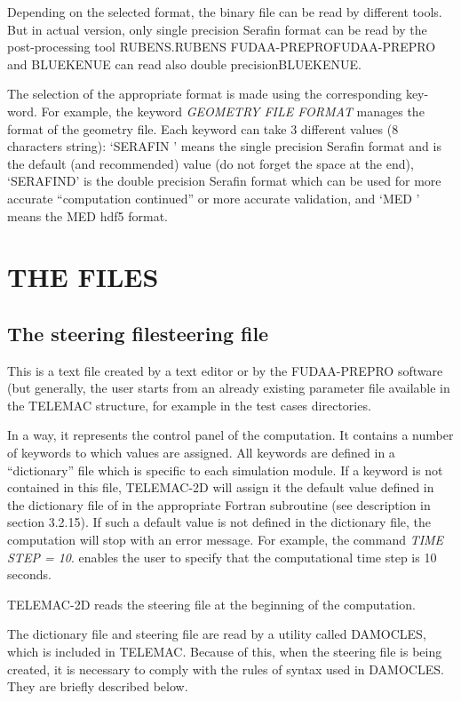  Depending on the selected format, the binary file can be read by different tools. But in actual version, only single precision Serafin format can be read by the post-processing tool RUBENS.RUBENS FUDAA-PREPROFUDAA-PREPRO and BLUEKENUE can read also double precisionBLUEKENUE.

 The selection of the appropriate format is made using the corresponding key-word. For example, the keyword \textit{GEOMETRY FILE FORMAT }manages the format of the geometry file. Each keyword can take 3 different values (8 characters string): `SERAFIN ' means the single precision Serafin format and is the default (and recommended) value (do not forget the space at the end), `SERAFIND' is the double precision Serafin format which can be used for more accurate ``computation continued'' or more accurate validation, and `MED     ' means the MED hdf5 format.


\section{ THE FILES}


\subsection{ The steering filesteering file}

 This is a text file created by a text editor or by the FUDAA-PREPRO software (but generally, the user starts from an already existing parameter file available in the TELEMAC structure, for example in the test cases directories.

 In a way, it represents the control panel of the computation. It contains a number of keywords to which values are assigned. All keywords are defined in a ``dictionary'' file which is specific to each simulation module. If a keyword is not contained in this file, TELEMAC-2D will assign it the default value defined in the dictionary file of in the appropriate Fortran subroutine (see description in section 3.2.15). If such a default value is not defined in the dictionary file, the computation will stop with an error message. For example, the command \textit{TIME STEP = 10}. enables the user to specify that the computational time step is 10 seconds.

 TELEMAC-2D reads the steering file at the beginning of the computation.

 The dictionary file and steering file are read by a utility called DAMOCLES, which is included in TELEMAC. Because of this, when the steering file is being created, it is necessary to comply with the rules of syntax used in DAMOCLES. They are briefly described below.

